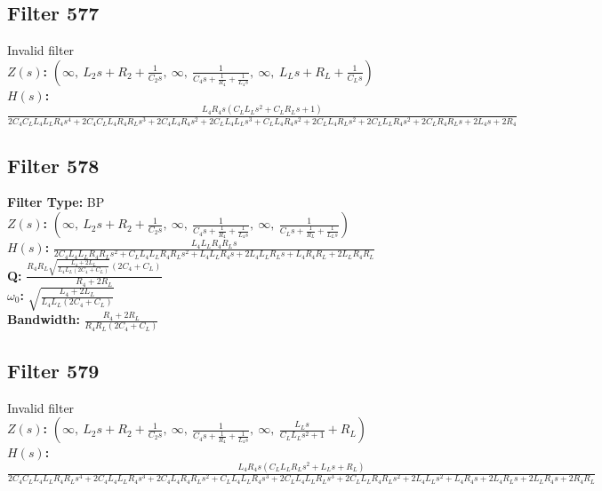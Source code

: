 \documentclass{article}
\begin{document}
\subsection*{Filter 577}
Invalid filter \\ 
\textbf{$Z(s)$:} $\left( \infty, \  L_{2} s + R_{2} + \frac{1}{C_{2} s}, \  \infty, \  \frac{1}{C_{4} s + \frac{1}{R_{4}} + \frac{1}{L_{4} s}}, \  \infty, \  L_{L} s + R_{L} + \frac{1}{C_{L} s}\right)$ \\ 
\textbf{$H(s)$:} $\frac{L_{4} R_{4} s \left(C_{L} L_{L} s^{2} + C_{L} R_{L} s + 1\right)}{2 C_{4} C_{L} L_{4} L_{L} R_{4} s^{4} + 2 C_{4} C_{L} L_{4} R_{4} R_{L} s^{3} + 2 C_{4} L_{4} R_{4} s^{2} + 2 C_{L} L_{4} L_{L} s^{3} + C_{L} L_{4} R_{4} s^{2} + 2 C_{L} L_{4} R_{L} s^{2} + 2 C_{L} L_{L} R_{4} s^{2} + 2 C_{L} R_{4} R_{L} s + 2 L_{4} s + 2 R_{4}}$ \\ 
\subsection*{Filter 578}
\textbf{Filter Type:} BP \\ 
\textbf{$Z(s)$:} $\left( \infty, \  L_{2} s + R_{2} + \frac{1}{C_{2} s}, \  \infty, \  \frac{1}{C_{4} s + \frac{1}{R_{4}} + \frac{1}{L_{4} s}}, \  \infty, \  \frac{1}{C_{L} s + \frac{1}{R_{L}} + \frac{1}{L_{L} s}}\right)$ \\ 
\textbf{$H(s)$:} $\frac{L_{4} L_{L} R_{4} R_{L} s}{2 C_{4} L_{4} L_{L} R_{4} R_{L} s^{2} + C_{L} L_{4} L_{L} R_{4} R_{L} s^{2} + L_{4} L_{L} R_{4} s + 2 L_{4} L_{L} R_{L} s + L_{4} R_{4} R_{L} + 2 L_{L} R_{4} R_{L}}$ \\ 
\textbf{Q:} $\frac{R_{4} R_{L} \sqrt{\frac{L_{4} + 2 L_{L}}{L_{4} L_{L} \left(2 C_{4} + C_{L}\right)}} \left(2 C_{4} + C_{L}\right)}{R_{4} + 2 R_{L}}$ \\ 
\textbf{$\omega_0$:} $\sqrt{\frac{L_{4} + 2 L_{L}}{L_{4} L_{L} \left(2 C_{4} + C_{L}\right)}}$ \\ 
\textbf{Bandwidth:} $\frac{R_{4} + 2 R_{L}}{R_{4} R_{L} \left(2 C_{4} + C_{L}\right)}$ \\ 
\subsection*{Filter 579}
Invalid filter \\ 
\textbf{$Z(s)$:} $\left( \infty, \  L_{2} s + R_{2} + \frac{1}{C_{2} s}, \  \infty, \  \frac{1}{C_{4} s + \frac{1}{R_{4}} + \frac{1}{L_{4} s}}, \  \infty, \  \frac{L_{L} s}{C_{L} L_{L} s^{2} + 1} + R_{L}\right)$ \\ 
\textbf{$H(s)$:} $\frac{L_{4} R_{4} s \left(C_{L} L_{L} R_{L} s^{2} + L_{L} s + R_{L}\right)}{2 C_{4} C_{L} L_{4} L_{L} R_{4} R_{L} s^{4} + 2 C_{4} L_{4} L_{L} R_{4} s^{3} + 2 C_{4} L_{4} R_{4} R_{L} s^{2} + C_{L} L_{4} L_{L} R_{4} s^{3} + 2 C_{L} L_{4} L_{L} R_{L} s^{3} + 2 C_{L} L_{L} R_{4} R_{L} s^{2} + 2 L_{4} L_{L} s^{2} + L_{4} R_{4} s + 2 L_{4} R_{L} s + 2 L_{L} R_{4} s + 2 R_{4} R_{L}}$ \\ 
\end{document}
